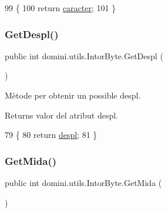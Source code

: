 \begin{DoxyCode}
99    \{
100       \textcolor{keywordflow}{return} \hyperlink{classdomini_1_1utils_1_1IntorByte_adbb2e8c31ead2f27d85ff39683b9a8a7}{caracter};
101    \}
\end{DoxyCode}
\mbox{\label{classdomini_1_1utils_1_1IntorByte_a5d99bc2397d586c3e3319eadf7f23e4d}} 
\subsubsection{\texorpdfstring{Get\+Despl()}{GetDespl()}}
{\footnotesize\ttfamily public int domini.\+utils.\+Intor\+Byte.\+Get\+Despl (\begin{DoxyParamCaption}{ }\end{DoxyParamCaption})\hspace{0.3cm}{\ttfamily [inline]}}



Mètode per obtenir un possible despl. 

\begin{DoxyReturn}{Returns}
valor del atribut despl. 
\end{DoxyReturn}

\begin{DoxyCode}
79    \{
80       \textcolor{keywordflow}{return} \hyperlink{classdomini_1_1utils_1_1IntorByte_a83872b8acc9ab187acbc2175d5bf320e}{despl};
81    \}
\end{DoxyCode}
\mbox{\label{classdomini_1_1utils_1_1IntorByte_abccf2f9cda2f62acdf0c1342f9acdead}} 
\subsubsection{\texorpdfstring{Get\+Mida()}{GetMida()}}
{\footnotesize\ttfamily public int domini.\+utils.\+Intor\+Byte.\+Get\+Mida (\begin{DoxyParamCaption}{ }\end{DoxyParamCaption})\hspace{0.3cm}{\ttfamily [inline]}}



